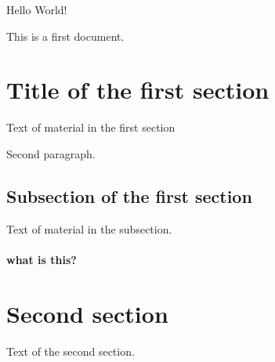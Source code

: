 \documentclass{article}
\begin{document}
Hello World!

This is a first document.

\section{Title of the first section}

Text of material in the first section

Second paragraph.

\subsection{Subsection of the first section}

Text of material in the subsection.

\paragraph{what is this?}

\section{Second section}

Text of the second section.
\end{document}
